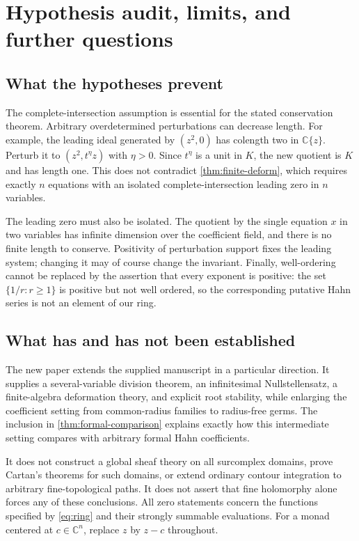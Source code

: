 \documentclass[11pt,letterpaper]{article}
\theoremstyle{definition}
\theoremstyle{remark}
\newcommand{\C}{\mathbb C}
\numberwithin{equation}{section}
\begin{document}
\section{Hypothesis audit, limits, and further questions}\label{sec:limits}

\subsection{What the hypotheses prevent}
The complete-intersection assumption is essential for the stated conservation theorem. Arbitrary overdetermined perturbations can decrease length. For example, the leading ideal generated by $(z^2,0)$ has colength two in $\C\{z\}$. Perturb it to $(z^2,t^\eta z)$ with $\eta>0$. Since $t^\eta$ is a unit in $K$, the new quotient is $K$ and has length one. This does not contradict \cref{thm:finite-deform}, which requires exactly $n$ equations with an isolated complete-intersection leading zero in $n$ variables.

The leading zero must also be isolated. The quotient by the single equation $x$ in two variables has infinite dimension over the coefficient field, and there is no finite length to conserve. Positivity of perturbation support fixes the leading system; changing it may of course change the invariant. Finally, well-ordering cannot be replaced by the assertion that every exponent is positive: the set $\{1/r:r\ge1\}$ is positive but not well ordered, so the corresponding putative Hahn series is not an element of our ring.

\subsection{What has and has not been established}
The new paper extends the supplied manuscript in a particular direction. It supplies a several-variable division theorem, an infinitesimal Nullstellensatz, a finite-algebra deformation theory, and explicit root stability, while enlarging the coefficient setting from common-radius families to radius-free germs. The inclusion in \cref{thm:formal-comparison} explains exactly how this intermediate setting compares with arbitrary formal Hahn coefficients.

It does not construct a global sheaf theory on all surcomplex domains, prove Cartan's theorems for such domains, or extend ordinary contour integration to arbitrary fine-topological paths. It does not assert that fine holomorphy alone forces any of these conclusions. All zero statements concern the functions specified by \eqref{eq:ring} and their strongly summable evaluations. For a monad centered at $c\in\C^n$, replace $z$ by $z-c$ throughout.
\end{document}
